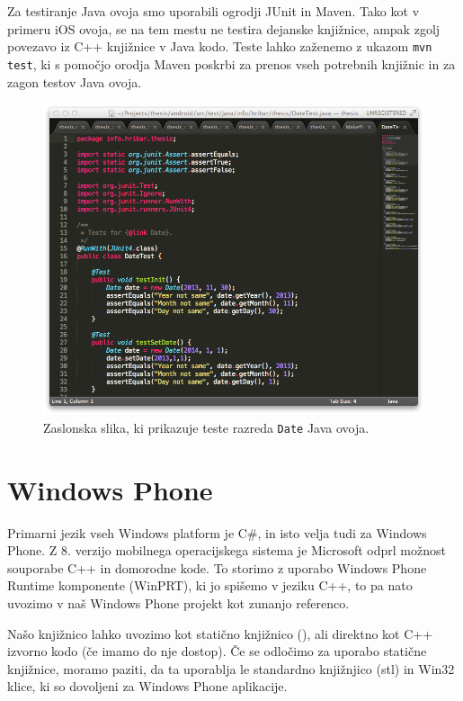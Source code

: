 Za testiranje Java ovoja smo uporabili ogrodji JUnit\cite{junit} in Maven\cite{maven}. Tako kot v primeru iOS ovoja, se na tem mestu ne testira dejanske knjižnice, ampak zgolj povezavo iz C++ knjižnice v Java kodo. Teste lahko zaženemo z ukazom \texttt{mvn test}, ki s pomočjo orodja Maven poskrbi za prenos vseh potrebnih knjižnic in za zagon testov Java ovoja.

\begin{figure}
 \includegraphics[width=\linewidth]{java-tests}
 \caption{Zaslonska slika, ki prikazuje teste razreda \texttt{Date} Java ovoja.}
 \label{fig:java-tests}
\end{figure}

\section{Windows Phone}

Primarni jezik vseh Windows platform je C\#, in isto velja tudi za Windows Phone. Z 8. verzijo mobilnega operacijskega sistema je Microsoft odprl možnost souporabe C++ in domorodne kode. To storimo z uporabo Windows Phone Runtime komponente (WinPRT), ki jo spišemo v jeziku C++, to pa nato uvozimo v naš Windows Phone projekt kot zunanjo referenco.

Našo knjižnico lahko uvozimo kot statično knjižnico (), ali direktno kot C++ izvorno kodo (če imamo do nje dostop). Če se odločimo za uporabo statične knjižnice, moramo paziti, da ta uporablja le standardno knjižnjico (\gls{stl}) in Win32 klice, ki so dovoljeni za Windows Phone aplikacije\cite{windows-static}.

